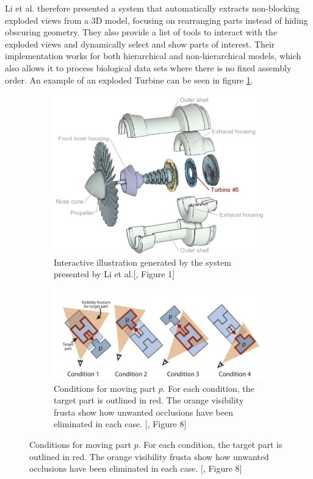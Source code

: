 Li et al. therefore presented a system that automatically extracts non-blocking exploded views from a 3D model, focusing on rearranging parts instead of hiding obscuring geometry.
They also provide a list of tools to interact with the exploded views and dynamically select and show parts of interest.
Their implementation works for both hierarchical and non-hierarchical models, which also allows it to process biological data sets where there is no fixed assembly order. An example of an exploded Turbine can be seen in figure \ref{fig:Li_fig1}.
\begin{figure}
	\centering
	\normalsize
	\begin{subfigure}[t]{0.49\textwidth}
		\centering
		\includegraphics[width=.95\linewidth]{fig/Images/AutomatedGenerationofInteractive3DExplodedViewDiagrams_Li2008_fig1}
		\caption[]{Interactive illustration generated by the system presented by Li et al.[\cite{Wilmot_Li_2008}, Figure 1]}
		\label{fig:Li_fig1}
	\end{subfigure}
	\smallskip
	\begin{subfigure}[t]{0.5\textwidth}
		\centering
		\includegraphics[width=1.1\linewidth]{fig/Images/AutomatedGenerationofInteractive3DExplodedViewDiagrams_Li2008_fig8}
		\caption[]{Conditions for moving part $p$. For each condition, the target part is outlined in red. The orange visibility frusta show how unwanted occlusions have been eliminated in each case. [\cite{Wilmot_Li_2008}, Figure 8]}
		\label{fig:conditionTests}
	\end{subfigure}
\end{figure}
